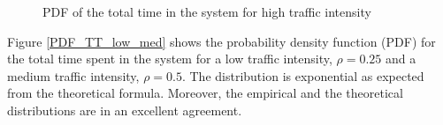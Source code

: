 \documentclass[12pt, a4paper]{article}
\begin{document}
\begin{figure}[H]
  \centering
  \hspace{0px}
  \caption{PDF of the total time in the system for high traffic intensity}
  \label{PDF_TT_high}
\end{figure}

Figure \ref{PDF_TT_low_med} shows the probability density function (PDF) 
for the total time spent in the system for a low traffic intensity, $\rho = 0.25$
and a medium traffic intensity, $\rho=0.5$. The distribution is exponential as expected
from the theoretical formula. Moreover, the empirical and the theoretical distributions
are in an excellent agreement.
\end{document}
